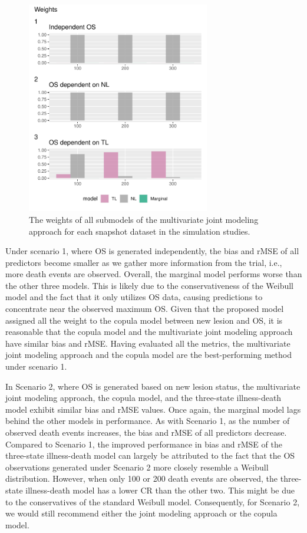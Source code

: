 \begin{figure}
\centering
\includegraphics[width=8cm]{chapters/figures/Weights_simulation.pdf}
\caption{The weights of all submodels of the multivariate joint modeling approach for each snapshot dataset in the simulation studies.\label{fig:weights_simulation}}
\end{figure}

Under scenario 1, where \ac{OS} is generated independently, the bias and \ac{rMSE} of all predictors become smaller as we gather more information from the trial, i.e., more death events are observed. Overall, the marginal model performs worse than the other three models. This is likely due to the conservativeness of the Weibull model and the fact that it only utilizes \ac{OS} data, causing predictions to concentrate near the observed maximum OS. Given that the proposed model assigned all the weight to the copula model between new lesion and OS, it is reasonable that the copula model and the multivariate joint modeling approach have similar bias and \ac{rMSE}. Having evaluated all the metrics, the multivariate joint modeling approach and the copula model are the best-performing method under scenario 1.

In Scenario 2, where \ac{OS} is generated based on new lesion status, the multivariate joint modeling approach, the copula model, and the three-state illness-death model exhibit similar bias and \ac{rMSE} values. Once again, the marginal model lags behind the other models in performance. As with Scenario 1, as the number of observed death events increases, the bias and \ac{rMSE} of all predictors decrease. Compared to Scenario 1, the improved performance in bias and \ac{rMSE} of the three-state illness-death model can largely be attributed to the fact that the \ac{OS} observations generated under Scenario 2 more closely resemble a Weibull distribution. However, when only 100 or 200 death events are observed, the three-state illness-death model has a lower \ac{CR} than the other two. This might be due to the conservatives of the standard Weibull model. Consequently, for Scenario 2, we would still recommend either the joint modeling approach or the copula model.

